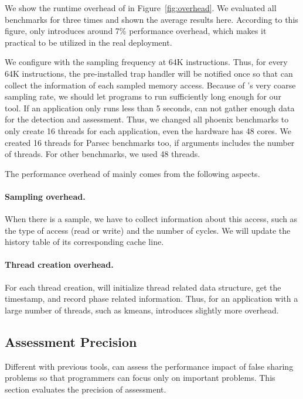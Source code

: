 We show the runtime overhead of \cheetah{} in Figure~\ref{fig:overhead}. We evaluated all benchmarks for three times and shown the average results here. According to this figure, \cheetah{} only introduces around 7\% performance overhead, which makes it practical to be utilized in the real deployment. 

We configure \cheetah{} with the sampling frequency at 64K instructions. Thus, for every 64K instructions, the pre-installed trap handler will be notified once so that \cheetah{} can collect the information of each sampled memory access. Because of \cheetah{}'s very coarse sampling rate, we should  let programs to run sufficiently long enough for our tool. If an application only runs less than 5 seconds, \cheetah{} can not gather enough data for the detection and assessment. Thus, we changed all phoenix benchmarks to only create 16 threads for each application, even the hardware has 48 cores.  We created 16 threads for Parsec benchmarks too, if arguments includes the number of threads. For other benchmarks, we used 48 threads. 

The performance overhead of \cheetah{} mainly comes from the following aspects. 
\paragraph{Sampling overhead.} When there is a sample, we have to collect information about this access, such as the type of access (read or write) and the number of cycles. We will update the history table of its corresponding cache line.

\paragraph{Thread creation overhead.} For each thread creation, \cheetah{} will initialize thread related data structure, get the timestamp, and record phase related information. Thus, for an application with a large number of threads, such as kmeans, \cheetah{} introduces slightly more overhead. 


\subsection{Assessment Precision}
\label{sec:precision}

Different with previous tools, \cheetah{} can assess the performance impact of false sharing problems so that programmers can focus only on important problems. This section evaluates the precision of assessment. 

